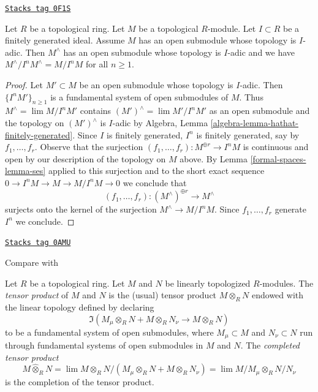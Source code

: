 \begin{lemma}
\label{formal-spaces-lemma-completion-adic-star}
\href{https://stacks.math.columbia.edu/tag/0F1S}{\texttt{Stacks tag 0F1S}}

Let $R$ be a topological ring. Let $M$ be a topological $R$-module.
Let $I \subset R$ be a finitely generated ideal. Assume $M$
has an open submodule whose topology is $I$-adic. Then $M^\wedge$
has an open submodule whose topology is $I$-adic and we have
$M^\wedge/I^n M^\wedge = M/I^nM$ for all $n \geq 1$.
\end{lemma}

\begin{proof}
Let $M' \subset M$ be an open submodule whose topology is $I$-adic.
Then $\{I^nM'\}_{n \geq 1}$ is a fundamental system of open submodules
of $M$. Thus $M^\wedge = \lim M/I^nM'$ contains
$(M')^\wedge = \lim M'/I^nM'$
as an open submodule and the topology on $(M')^\wedge$ is
$I$-adic by Algebra, Lemma \ref{algebra-lemma-hathat-finitely-generated}.
Since $I$ is finitely generated, $I^n$ is finitely generated,
say by $f_1, \ldots, f_r$. Observe that the surjection
$(f_1, \ldots, f_r) : M^{\oplus r} \to I^n M$ is continuous
and open by our description of the topology on $M$ above.
By Lemma \ref{formal-spaces-lemma-ses} applied to this surjection and to the
short exact sequence $0 \to I^nM \to M \to M/I^nM \to 0$
we conclude that
$$
(f_1, \ldots, f_r) :
(M^\wedge)^{\oplus r} \longrightarrow M^\wedge
$$
surjects onto the kernel of the surjection $M^\wedge \to M/I^nM$.
Since $f_1, \ldots, f_r$ generate $I^n$ we conclude.
\end{proof}

\begin{definition}
\label{formal-spaces-definition-toplogy-tensor-product}
\href{https://stacks.math.columbia.edu/tag/0AMU}{\texttt{Stacks tag 0AMU}}

\begin{reference}
Compare with \cite[0, Section 7.7]{EGA}
\end{reference}
Let $R$ be a topological ring. Let $M$ and $N$ be linearly
topologized $R$-modules. The {\it tensor product} of $M$ and $N$
is the (usual) tensor product $M \otimes_R N$ endowed
with the linear topology defined by declaring
$$
\Im(M_\mu \otimes_R N + M \otimes_R N_\nu \longrightarrow M \otimes_R N)
$$
to be a fundamental system of open submodules, where
$M_\mu \subset M$ and $N_\nu \subset N$ run through fundamental
systems of open submodules in $M$ and $N$.
The {\it completed tensor product}
$$
M \widehat{\otimes}_R N =
\lim M \otimes_R N/(M_\mu \otimes_R N + M \otimes_R N_\nu) =
\lim M/M_\mu \otimes_R N/N_\nu
$$
is the completion of the tensor product.
\end{definition}

